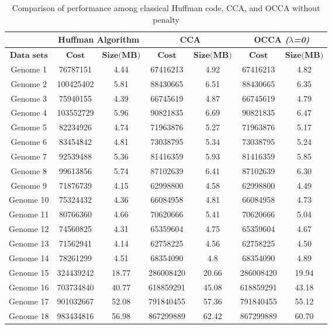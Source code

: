 \documentclass[twocolumn,12pt,a4paper]{article}
\begin{document}
\begin{table}[!thpb]
\renewcommand{\arraystretch}{1.1}
\small
\label{table4}
\caption{Comparison of performance among classical Huffman code, CCA, and OCCA without penalty}

\begin{tabular}{|c | c |c | c |c | c |c|}
\hline
 & \multicolumn{2}{c|}{Huffman Algorithm} & \multicolumn{2}{c|}{CCA }& \multicolumn{2}{c|}{OCCA \textit{($\lambda$=0)}}\\\hline
$\textbf{Data sets}$ & $\textbf{Cost}$	& $\textbf{Size(MB)}$ &	$\textbf{Cost}$&	$\textbf{Size(MB)}$&$\textbf{Cost}$&	$\textbf{Size(MB)}$
\\\hline
Genome 1& 76787151  &	4.44	&67416213   & 4.92	& 67416213 & 4.82 \\\hline
Genome 2& 100425402 &  	5.81	& 88430665	& 6.51	& 88430665&  6.35 \\\hline
Genome 3& 75940155  &	4.39    &66745619	& 4.87&	66745619 & 4.79 \\\hline
Genome 4& 103552729 &	5.96    &90821835&	6.69 &	90821835  & 6.47\\\hline
Genome 5& 82234926  &	4.74	&71963876	& 5.27 &	71963876 &5.17 \\\hline
Genome 6& 83454842  &   4.81	&73038795	& 5.34	&73038795 & 5.24\\\hline
Genome 7& 92539488  &	5.36    &81416359   &5.93	&81416359 & 5.85\\\hline
Genome 8& 99613856  & 	5.74	&87102639   &6.41	&87102639&	6.30 \\\hline
Genome 9& 71876739  &	4.15    &62998800  &4.58 &	62998800 &	4.49 \\\hline
Genome 10& 75324432 & 	4.36	&66084958  &4.81	&66084958&	4.73 \\\hline
Genome 11& 80766360 &	4.66    &70620666  &5.41&	70620666&	5.04 \\\hline
Genome 12& 74560825 &	4.31    &65359604  &4.75	&65359604&	4.67\\\hline
Genome 13& 71562941 & 	4.14	&62758225  &4.56	&	62758225 &	4.50\\\hline
Genome 14& 78261299 & 	4.51    &68354090  &4.8&	68354090& 4.89  \\\hline
Genome 15& 324439242& 	18.77    &286008420 & 20.66	 &	286008420 &	19.94 \\\hline
Genome 16& 703734840&  40.77    &618859291 & 45.08  &	618859291 &	43.18 \\\hline
Genome 17& 901032667&  52.08    &791840455 &	57.36 &	791840455 &	55.12 \\\hline
Genome 18& 983434816&  56.98    &867299889 &	62.42 &	867299889 & 60.70 \\\hline

\end{tabular}
\end{table}
\end{document}
